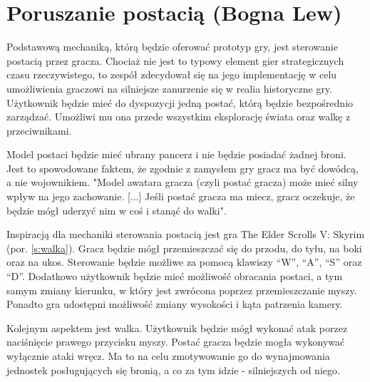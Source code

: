 \section{Poruszanie postacią (Bogna Lew)}
Podstawową mechaniką, którą będzie oferować prototyp gry, jest sterowanie postacią przez gracza. Chociaż nie jest
to typowy element gier strategicznych czasu rzeczywistego, to zespół zdecydował się na jego implementację w celu umożliwienia
graczowi na silniejsze zanurzenie się w realia historyczne gry. Użytkownik będzie
mieć do dyspozycji jedną postać, którą będzie bezpośrednio zarządzać. Umożliwi mu ona przede wszystkim eksplorację
świata oraz walkę z przeciwnikami.

Model postaci będzie mieć ubrany pancerz i nie będzie posiadać żadnej broni. Jest to spowodowane faktem, że zgodnie z
zamysłem gry gracz ma być dowódcą, a nie wojownikiem. "Model awatara gracza (czyli postać gracza) może mieć silny wpływ
na jego zachowanie. [...] Jeśli postać gracza ma miecz, gracz oczekuje, że będzie mógł uderzyć nim w coś i stanąć do
walki"\cite{projektowanie_gier}. 

Inspiracją dla mechaniki sterowania postacią jest gra The Elder Scrolls V: Skyrim (por. \ref{s:walka}). Gracz będzie mógł przemieszczać się
do przodu, do tyłu, na boki oraz na ukos. Sterowanie będzie możliwe za pomocą klawiszy  “W”, “A”, “S” oraz “D”.
Dodatkowo użytkownik będzie mieć możliwość obracania postaci, a tym samym zmiany kierunku, w który jest zwrócona poprzez
przemieszczanie myszy. Ponadto gra udostępni możliwość zmiany wysokości i kąta patrzenia kamery.

Kolejnym aspektem jest walka. Użytkownik będzie mógł wykonać atak porzez naciśnięcie prawego przycisku myszy. Postać
gracza będzie mogła wykonywać wyłącznie ataki wręcz. Ma to na celu zmotywowanie go do wynajmowania jednostek posługujących
się bronią, a co za tym idzie - silniejszych od niego.